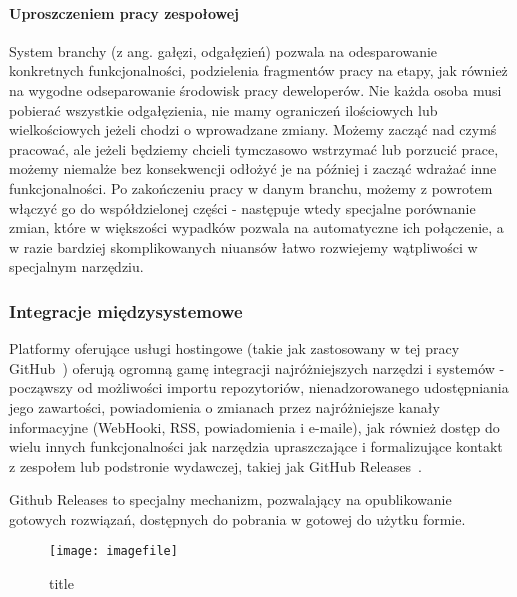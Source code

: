 \paragraph{Uproszczeniem pracy zespołowej}
System branchy (z ang. gałęzi, odgałęzień) pozwala na odesparowanie konkretnych funkcjonalności, 
podzielenia fragmentów pracy na etapy, jak również na wygodne odseparowanie środowisk pracy deweloperów.
Nie każda osoba musi pobierać wszystkie odgałęzienia, nie mamy ograniczeń ilościowych lub wielkościowych 
jeżeli chodzi o wprowadzane zmiany. Możemy zacząć nad czymś pracować, ale jeżeli będziemy chcieli tymczasowo 
wstrzymać lub porzucić prace, możemy niemalże bez konsekwencji odłożyć je na później i zacząć wdrażać 
inne funkcjonalności.
Po zakończeniu pracy w danym branchu, możemy z powrotem włączyć go do współdzielonej części - następuje 
wtedy specjalne porównanie zmian, które w większości wypadków pozwala na automatyczne ich połączenie, 
a w razie bardziej skomplikowanych niuansów łatwo rozwiejemy wątpliwości w specjalnym narzędziu.

\subsubsection{Integracje międzysystemowe}
Platformy oferujące usługi hostingowe (takie jak zastosowany w tej pracy GitHub~\cite{github}) oferują 
ogromną gamę integracji najróżniejszych narzędzi i systemów - począwszy od możliwości importu 
repozytoriów, nienadzorowanego udostępniania jego zawartości, powiadomienia o zmianach przez najróżniejsze 
kanały informacyjne (WebHooki, RSS, powiadomienia i e-maile), jak również dostęp do wielu innych 
funkcjonalności jak narzędzia upraszczające i formalizujące kontakt z zespołem 
lub podstronie wydawczej, takiej jak GitHub Releases~\cite{githubReleases}.

Github Releases to specjalny mechanizm, pozwalający na opublikowanie gotowych rozwiązań, dostępnych do 
pobrania w gotowej do użytku formie. 
\begin{figure}[ht]
    \centering
    \texttt{[image: imagefile]}
    \caption{title}
    \label{}

\end{figure}

